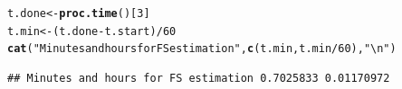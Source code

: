 \documentclass[9pt]{article}\usepackage[]{graphicx}\usepackage[]{xcolor}
\makeatletter
\newcommand{\hlnum}[1]{\textcolor[rgb]{0.686,0.059,0.569}{#1}}%
\newcommand{\hlstr}[1]{\textcolor[rgb]{0.192,0.494,0.8}{#1}}%
\newcommand{\hlopt}[1]{\textcolor[rgb]{0,0,0}{#1}}%
\newcommand{\hlstd}[1]{\textcolor[rgb]{0.345,0.345,0.345}{#1}}%
\newcommand{\hlkwb}[1]{\textcolor[rgb]{0.69,0.353,0.396}{#1}}%
\newcommand{\hlkwd}[1]{\textcolor[rgb]{0.737,0.353,0.396}{\textbf{#1}}}%
\newenvironment{kframe}{%
 \def\at@end@of@kframe{}%
 \ifinner\ifhmode%
  \def\at@end@of@kframe{\end{minipage}}%
  \begin{minipage}{\columnwidth}%
 \fi\fi%
 \def\FrameCommand##1{\hskip\@totalleftmargin \hskip-\fboxsep
 \colorbox{shadecolor}{##1}\hskip-\fboxsep
     \hskip-\linewidth \hskip-\@totalleftmargin \hskip\columnwidth}%
 \MakeFramed {\advance\hsize-\width
   \@totalleftmargin\z@ \linewidth\hsize
   \@setminipage}}%
 {\par\unskip\endMakeFramed%
 \at@end@of@kframe}
\newenvironment{knitrout}{}{} %
\theoremstyle{definition}
\theoremstyle{remark}
\makeatother
\begin{document}
\begin{knitrout}
\color{fgcolor}\begin{kframe}
\begin{alltt}
\hlstd{t.done} \hlkwb{<-} \hlkwd{proc.time}\hlstd{()[}\hlnum{3}\hlstd{]}
\hlstd{t.min} \hlkwb{<-} \hlstd{(t.done} \hlopt{-} \hlstd{t.start)}\hlopt{/}\hlnum{60}
\hlkwd{cat}\hlstd{(}\hlstr{"Minutes and hours for FS estimation"}\hlstd{,} \hlkwd{c}\hlstd{(t.min, t.min}\hlopt{/}\hlnum{60}\hlstd{),} \hlstr{"\textbackslash{}n"}\hlstd{)}
\end{alltt}
\begin{verbatim}
## Minutes and hours for FS estimation 0.7025833 0.01170972
\end{verbatim}
\end{kframe}
\end{knitrout}
\end{document}
